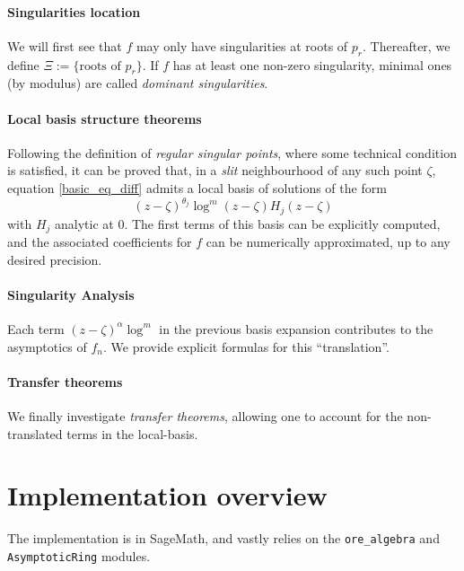 \documentclass[../main.tex]{subfiles}
\begin{document}
\paragraph*{Singularities location}
We will first see that $f$ may only have singularities at roots of $p_r$. Thereafter, we define $\Xi := \{ \text{roots of } p_r\}$. If $f$ has at least one non-zero singularity, minimal ones (by modulus) are called \emph{dominant singularities}.

\paragraph*{Local basis structure theorems}
Following the definition of \emph{regular singular points}, where some technical condition is satisfied, it can be proved that, in a \emph{slit} neighbourhood of any such point $\zeta$, equation \eqref{basic_eq_diff} admits a local basis of solutions of the form $${(z - \zeta)}^{\theta_j} \log^m (z - \zeta) H_j (z - \zeta)$$ with $H_j$ analytic at 0. The first terms of this basis can be explicitly computed, and the associated coefficients for $f$ can be numerically approximated, up to any desired precision.

\paragraph*{Singularity Analysis}
Each term ${(z - \zeta)}^\alpha \log^m$ in the previous basis expansion contributes to the asymptotics of $f_n$. We provide explicit formulas for this ``translation''.

\paragraph*{Transfer theorems}
We finally investigate \emph{transfer theorems}, allowing one to account for the non-translated terms in the local-basis.


\section{Implementation overview}

The implementation is in SageMath, and vastly relies on the \verb|ore_algebra| and \verb|AsymptoticRing| modules.

\paragraph{}
\end{document}
